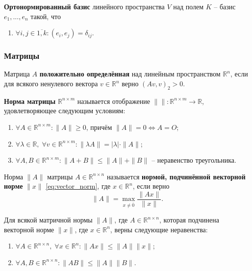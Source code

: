 \documentclass{article}
\begin{document}
\begin{define}
	\textbf{Ортонормированный базис} линейного пространства $V$ над полем
	$K$ -- базис $e_1,...,e_n$ такой, что
	\begin{enumerate}[nosep]
		\item $\forall i,j\in\overline{1,k}: (e_i,e_j)=\delta_{ij}$.
	\end{enumerate}
\end{define}

\subsubsection{Матрицы}
\begin{define}
	Матрица $A$ \textbf{положительно определённая} над линейным
	пространством $\mathbb R^n$, если для всякого ненулевого вектора
	$v\in \mathbb R^n$ верно $(Av, v)_2>0$.
\end{define}

\begin{define}
	\textbf{Норма матрицы} $\mathbb R^{n\times m}$
	называется отображение $\|\|: \mathbb R^{n\times m}\rightarrow
	\mathbb R$, удовлетворяющее следующим условиям:
	\begin{enumerate}[nosep]
		\item $\forall A\in\mathbb R^{n\times m}: \|A\|\ge 0$, причём
			$\|A\|=0\Leftrightarrow A=O$;
		\item $\forall \lambda\in \mathbb R,\;\forall v\in
			\mathbb R^{n\times m}:
			\|\lambda A\|=|\lambda|\cdot\|A\|$;
		\item $\forall A,B\in\mathbb R^{n\times m}: \|A+B\|\le\|A\|+\|B\|$ --
			неравенство треугольника.
	\end{enumerate}
\end{define}

\begin{define}
	Норма $\|A\|$ матрицы $A\in \mathbb R^{n\times n}$ называется
	\textbf{нормой, подчинённой векторной норме} $\|x\|$
	\eqref{eq:vector_norm}, где $x\in \mathbb R^n$, если верно
	\[\|A\|=\max_{x\ne \overline{0}}\frac{\|Ax\|}{\|x\|}.\]
\end{define}

\begin{lemma}
	Для всякой матричной нормы $\|A\|$, где $A\in\mathbb R^{n\times n}$,
	которая подчинена векторной норме $\|x\|$, где $x\in\mathbb R^n$, верны
	следующие неравенства:
	\begin{enumerate}[nosep]
		\item $\forall A\in\mathbb R^{n\times n},\;\forall x\in\mathbb
			R^n: \|Ax\|\le\|A\|\|x\|$;
		\item $\forall A,B\in\mathbb R^{n\times n}:
			\|AB\|\le\|A\|\|B\|$.
	\end{enumerate}
\end{lemma}
\end{document}
